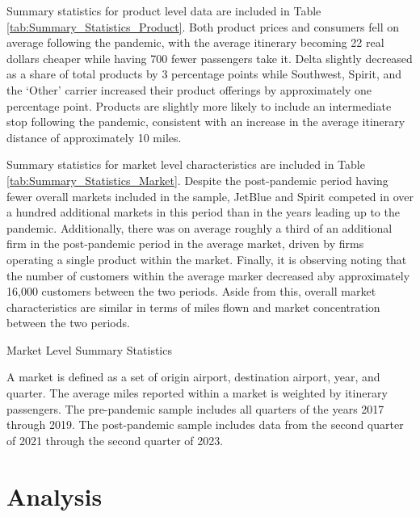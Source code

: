 \documentclass{article}
\begin{document}
    Summary statistics for product level data are included in Table \ref{tab:Summary_Statistics_Product}. Both product prices and consumers fell on average following the pandemic, with the average itinerary becoming 22 real dollars cheaper while having 700 fewer passengers take it. Delta slightly decreased as a share of total products by 3 percentage points while Southwest, Spirit, and the `Other' carrier increased their product offerings by approximately one percentage point. Products are slightly more likely to include an intermediate stop following the pandemic, consistent with an increase in the average itinerary distance of approximately 10 miles. 

    Summary statistics for market level characteristics are included in Table \ref{tab:Summary_Statistics_Market}. Despite the post-pandemic period having fewer overall markets included in the sample, JetBlue and Spirit competed in over a hundred additional markets in this period than in the years leading up to the pandemic. Additionally, there was on average roughly a third of an additional firm in the post-pandemic period in the average market, driven by firms operating a single product within the market. Finally, it is observing noting that the number of customers within the average marker decreased aby approximately 16,000 customers between the two periods. Aside from this, overall market characteristics are similar in terms of miles flown and market concentration between the two periods. 

    \begin{table}
        \caption{Market Level Summary Statistics}
        \label{tab:Summary_Statistics_Market}
                \vspace{-15mm}
\begin{center}
            
                    \footnotesize{A market is defined as a set of origin airport, destination airport, year, and quarter. The average miles reported within a market is weighted by itinerary passengers. The pre-pandemic sample includes all quarters of the years 2017 through 2019. The post-pandemic sample includes data from the second quarter of 2021 through the second quarter of 2023. }

\end{center}
    \end{table}

	\section{Analysis}
	\label{sec:Analysis}
	
\end{document}
